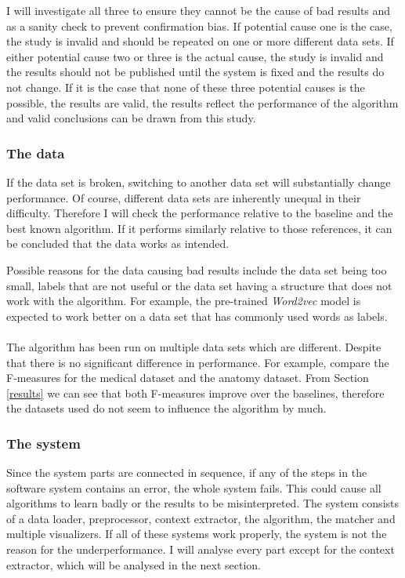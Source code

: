 \documentclass{article}
\begin{document}
  I will investigate all three to ensure they cannot be the cause of bad results and as a sanity check to prevent confirmation bias.
  If potential cause one is the case, the study is invalid and should be repeated on one or more different data sets. If either potential cause two or three is the actual cause, the study is invalid and the results should not be published until the system is fixed and the results do not change. If it is the case that none of these three potential causes is the possible, the results are valid, the results reflect the performance of the algorithm and valid conclusions can be drawn from this study.
  
  \subsubsection{The data}
  If the data set is broken, switching to another data set will substantially change performance. Of course, different data sets are inherently unequal in their difficulty. Therefore I will check the performance relative to the baseline and the best known algorithm. If it performs similarly relative to those references, it can be concluded that the data works as intended.

  Possible reasons for the data causing bad results include the data set being too small, labels that are not useful or the data set having a structure that does not work with the algorithm. For example, the pre-trained \emph{Word2vec} model is expected to work better on a data set that has commonly used words as labels. %
  \paragraph{}
 The algorithm has been run on multiple data sets which are different. Despite that there is no significant difference in performance. For example, compare the F-measures for the medical dataset and the anatomy dataset. From Section \ref{results} we can see that both F-measures improve over the baselines, therefore the datasets used do not seem to influence the algorithm by much.
  \subsubsection{The system}
  Since the system parts are connected in sequence, if any of the steps in the software system contains an error, the whole system fails. This could cause all algorithms to learn badly or the results to be misinterpreted. The system consists of a data loader, preprocessor, context extractor, the algorithm, the matcher and multiple visualizers. If all of these systems work properly, the system is not the reason for the underperformance. I will analyse every part except for the context extractor, which will be analysed in the next section.
  
\end{document}
